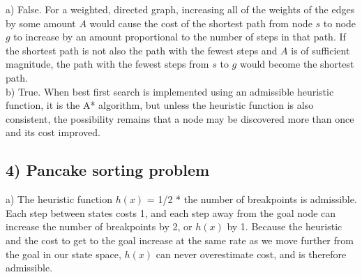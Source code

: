 \documentclass{article}
\begin{document}
a) False. For a weighted, directed graph, increasing all of the weights of the edges by some amount $A$ would cause the cost of the shortest path from node $s$ to node $g$ to increase by an amount proportional to the number of steps in that path. If the shortest path is not also the path with the fewest steps and $A$ is of sufficient magnitude, the path with the fewest steps from $s$ to $g$ would become the shortest path.\\

b) True. When best first search is implemented using an admissible heuristic function, it is the A* algorithm, but unless the heuristic function is also consistent, the possibility remains that a node may be discovered more than once and its cost improved.


\subsection*{4) Pancake sorting problem}

a) The heuristic function $h(x)$ = 1/2 * the number of breakpoints is admissible. Each step between states costs 1, and each step away from the goal node can increase the number of breakpoints by 2, or $h(x)$ by 1. Because the heuristic and the cost to get to the goal increase at the same rate as we move further from the goal in our state space, $h(x)$ can never overestimate cost, and is therefore admissible.
\end{document}
